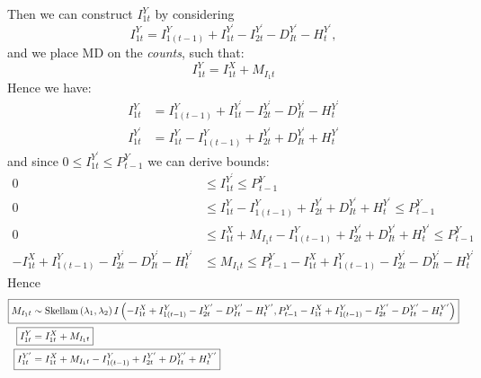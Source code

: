 \documentclass[a4paper]{article}
\begin{document}
Then we can construct $I^Y_{1t}$ by considering
\begin{equation*}
    I^Y_{1t} = I^Y_{1(t - 1)} + I^{Y^\prime}_{1t} - I^{Y^\prime}_{2t} - D^{Y^\prime}_{It} - H^{Y^\prime}_t,
\end{equation*}
and we place MD on the \textit{counts}, such that:
\begin{equation*}
    I^Y_{1t} = I^X_{1t} + M_{I_1t}
\end{equation*}
Hence we have:
\begin{align*}
    I^Y_{1t} &= I^Y_{1(t - 1)} + I^{Y^\prime}_{1t} - I^{Y^\prime}_{2t} - D^{Y^\prime}_{It} - H^{Y^\prime}_t\\
    I^{Y^\prime}_{1t} &= I^Y_{1t} - I^Y_{1(t - 1)} + I^{Y^\prime}_{2t} + D^{Y^\prime}_{It} + H^{Y^\prime}_t
\end{align*}
and since $0 \leq I^{Y^\prime}_{1t} \leq P^Y_{t - 1}$ we can derive bounds:
\begin{align*}
    0 &\leq I^{Y^\prime}_{1t} \leq P^Y_{t - 1}\\
    0 &\leq I^Y_{1t} - I^Y_{1(t - 1)} + I^{Y^\prime}_{2t} + D^{Y^\prime}_{It} + H^{Y^\prime}_t \leq P^Y_{t - 1}\\
    0 &\leq I^X_{1t} + M_{I_1t} - I^Y_{1(t - 1)} + I^{Y^\prime}_{2t} + D^{Y^\prime}_{It} + H^{Y^\prime}_t \leq P^Y_{t - 1}\\
    -I^X_{1t} + I^Y_{1(t - 1)} - I^{Y^\prime}_{2t} - D^{Y^\prime}_{It} - H^{Y^\prime}_t &\leq M_{I_1t} \leq P^Y_{t - 1} - I^X_{1t} + I^Y_{1(t - 1)} - I^{Y^\prime}_{2t} - D^{Y^\prime}_{It} - H^{Y^\prime}_t
\end{align*}
Hence
\begin{align*}
\Aboxed{M_{I_1t} &\sim \mbox{Skellam}\left(\lambda_1, \lambda_2\right)I\left(-I^X_{1t} + I^Y_{1(t - 1)} - I^{Y^\prime}_{2t} - D^{Y^\prime}_{It} - H^{Y^\prime}_t, P^Y_{t - 1} - I^X_{1t} + I^Y_{1(t - 1)} - I^{Y^\prime}_{2t} - D^{Y^\prime}_{It} - H^{Y^\prime}_t\right)}\\
    \Aboxed{I^Y_{1t} &= I^X_{1t} + M_{I_1t}}\\
    \Aboxed{I^{Y^\prime}_{1t} &= I^X_{1t} + M_{I_1t} - I^Y_{1(t - 1)} + I^{Y^\prime}_{2t} + D^{Y^\prime}_{It} + H^{Y^\prime}_t}
\end{align*}
\end{document}
